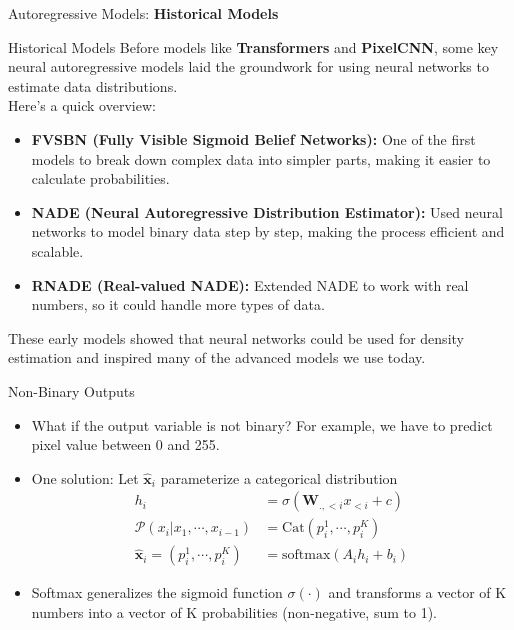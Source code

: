 \begin{frame}[allowframebreaks]{}
    \centering
    \LARGE Autoregressive Models: \textbf{Historical Models}
\end{frame}

\begin{frame}[allowframebreaks]{Historical Models}
    Before models like \textbf{Transformers} and \textbf{PixelCNN}, some key neural autoregressive models laid 
    the groundwork for using neural networks to estimate data distributions. \\
    Here’s a quick overview:

    \begin{itemize}
        \item \textbf{FVSBN (Fully Visible Sigmoid Belief Networks):} 
        One of the first models to break down complex data into simpler parts, making it easier to calculate probabilities.
        \item \textbf{NADE (Neural Autoregressive Distribution Estimator):} 
        Used neural networks to model binary data step by step, making the process efficient and scalable.
        \item \textbf{RNADE (Real-valued NADE):} 
        Extended NADE to work with real numbers, so it could handle more types of data.
    \end{itemize}

    These early models showed that neural networks could be used for density estimation and inspired many of the advanced models we use today.
\end{frame}




\begin{frame}{Non-Binary Outputs}
    \begin{itemize}
        \item What if the output variable is not binary? For example, we have to predict pixel value between 0 and 255.
        \item One solution: Let $\mathbf{\hat{x}}_i$ parameterize a categorical distribution
        \begin{align*}
            h_i &= \sigma(\mathbf{W}_{.,<i} x_{<i} + c)\\
            \mathcal{P}(x_i | x_1, \cdots, x_{i-1}) &= \text{Cat}(p_i^1, \cdots, p_i^K)\\
            \mathbf{\hat{x}}_i = (p_i^1, \cdots, p_i^K) &= \text{softmax} (A_i h_i + b_i)
        \end{align*}
        \item Softmax generalizes the sigmoid function $\sigma(\cdot)$ and transforms a vector of K numbers into a vector of K probabilities (non-negative, sum to 1).

    \end{itemize}
\end{frame}



